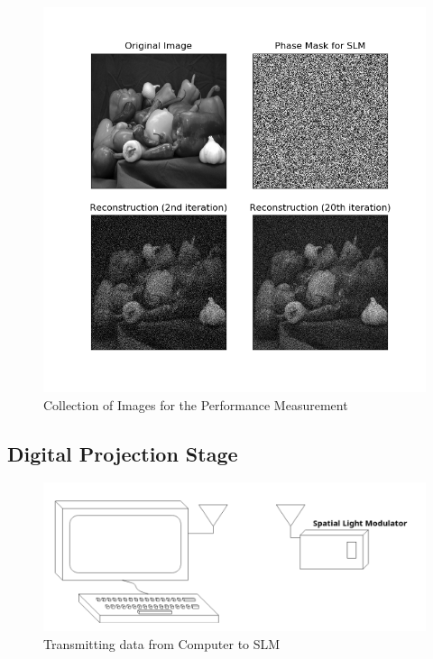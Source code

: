 \documentclass[12pt]{article}
\begin{document}
\begin{figure}
    \centering
    \includegraphics[width=\textwidth]{Result.png}
    \caption{Collection of Images for the Performance Measurement}
    \label{fig:images_recon}
\end{figure}


\subsection{Digital Projection Stage}

\begin{figure}
    \centering
    \includegraphics[width=\textwidth]{transmission}
    \caption{Transmitting data from Computer to SLM}
    \label{fig:my_label}
\end{figure}
\end{document}
